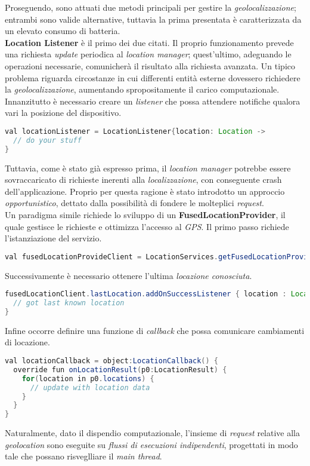 \documentclass{article}
\begin{document}
Proseguendo, sono attuati due metodi principali per gestire la \textit{geolocalizzazione}; entrambi sono valide alternative, tuttavia la prima presentata è caratterizzata da un elevato consumo di batteria.\vspace*{7pt}\\
\textbf{Location Listener} è il primo dei due citati. Il proprio funzionamento prevede una richiesta \textit{update} periodica al \textit{location manager}; quest'ultimo, adeguando le operazioni necessarie, comunicherà il risultato alla richiesta avanzata. Un tipico problema riguarda circostanze in cui differenti entità esterne dovessero richiedere la \textit{geolocalizzazione}, aumentando spropositamente il carico computazionale.\\
Innanzitutto è necessario creare un \textit{listener} che possa attendere notifiche qualora vari la posizione del dispositivo.
\begin{lstlisting}[language=JAVA]
val locationListener = LocationListener{location: Location -> 
  // do your stuff
}
\end{lstlisting}
Tuttavia, come è stato già espresso prima, il \textit{location manager} potrebbe essere sovraccaricato di richieste inerenti alla \textit{localizzazione}, con conseguente crash dell'applicazione. Proprio per questa ragione è stato introdotto un approccio \textit{opportunistico}, dettato dalla possibilità di fondere le molteplici \textit{request}.\vspace*{7pt}\\
Un paradigma simile richiede lo sviluppo di un \textbf{FusedLocationProvider}, il quale gestisce le richieste e ottimizza l'accesso al \textit{GPS}. Il primo passo richiede l'istanziazione del servizio.
\begin{lstlisting}[language=JAVA]
val fusedLocationProvideClient = LocationServices.getFusedLocationProviderClient(this)
\end{lstlisting}
Successivamente è necessario ottenere l'ultima \textit{locazione conosciuta}.
\begin{lstlisting}[language=JAVA]
fusedLocationClient.lastLocation.addOnSuccessListener { location : Location? -> 
  // got last known location
}
\end{lstlisting}
Infine occorre definire una funzione di \textit{callback} che possa comunicare cambiamenti di locazione.
\begin{lstlisting}[language=JAVA]
val locationCallback = object:LocationCallback() {
  override fun onLocationResult(p0:LocationResult) {
    for(location in p0.locations) {
      // update with location data
    }
  }
}
\end{lstlisting}
Naturalmente, dato il dispendio computazionale, l'insieme di \textit{request} relative alla \textit{geolocation} sono eseguite su \textit{flussi di esecuzioni indipendenti}, progettati in modo tale che possano risveglliare il \textit{main thread}.
\end{document}
